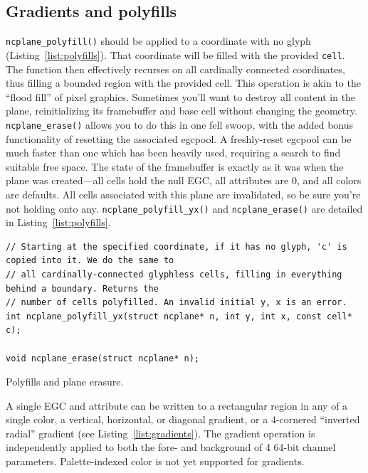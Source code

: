 \documentclass[letterpaper,10pt]{article}
\begin{document}
\subsection{Gradients and polyfills}
\texttt{ncplane\_polyfill()} should be applied to a coordinate with no glyph
(Listing~\ref{list:polyfills}). That coordinate will be filled with the provided
\texttt{cell}. The function then effectively recurses on all cardinally
connected coordinates, thus filling a bounded region with the provided cell.
This operation is akin to the ``flood
fill'' of pixel graphics. Sometimes you'll want to destroy all content in the
plane, reinitializing its framebuffer and base cell without changing the
geometry. \texttt{ncplane\_erase()} allows you to do this in one fell swoop,
with the added bonus functionality of resetting the associated egcpool. A
freshly-reset egcpool can be much faster than one which has been heavily used,
requiring a search to find suitable free space. The state of the framebuffer is
exactly as it was when the plane was created---all cells hold the null EGC, all
attributes are 0, and all colors are defaults. All cells associated with this
plane are invalidated, so be sure you're not holding onto any. \texttt{ncplane\_polyfill\_yx()}
and \texttt{ncplane\_erase()} are detailed in Listing~\ref{list:polyfills}.

\begin{listing}[!htb]
\begin{verbatim}
// Starting at the specified coordinate, if it has no glyph, 'c' is copied into it. We do the same to
// all cardinally-connected glyphless cells, filling in everything behind a boundary. Returns the
// number of cells polyfilled. An invalid initial y, x is an error.
int ncplane_polyfill_yx(struct ncplane* n, int y, int x, const cell* c);

void ncplane_erase(struct ncplane* n);
\end{verbatim}
\caption{Polyfills and plane erasure.}
\label{list:polyfills}
\end{listing}

A single EGC and attribute can be written to a rectangular region in any of
a single color, a vertical, horizontal, or diagonal gradient, or a 4-cornered
``inverted radial'' gradient (see Listing~\ref{list:gradients}). The gradient
operation is independently applied to both the fore- and background of 4 64-bit
channel parameters. Palette-indexed color is not yet supported for gradients.
\end{document}

